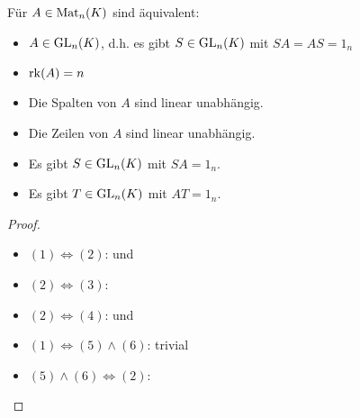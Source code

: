 \begin{conclusion}
	Für $A\in \operatorname{Mat}_n(K)$ sind äquivalent:
	\begin{itemize}
		\item $A\in \operatorname{GL}_n(K)$, d.h. es gibt $S\in \operatorname{GL}_n(K)$ mit $SA=AS=1_n$
		\item $\operatorname{rk}(A)=n$
		\item Die Spalten von $A$ sind linear unabhängig.
		\item Die Zeilen von $A$ sind linear unabhängig.
		\item Es gibt $S\in \operatorname{GL}_n(K)$ mit $SA=1_n$.
		\item Es gibt $T\in \operatorname{GL}_n(K)$ mit $AT=1_n$.
	\end{itemize}
\end{conclusion}
\begin{proof}
	\begin{itemize}
		\item $(1)\iff (2)$:  und 
		\item $(2)\iff (3)$: 
		\item $(2)\iff (4)$:  und 
		\item $(1)\iff (5)\land (6)$: trivial
		\item $(5)\land (6)\iff (2)$: 
	\end{itemize}
\end{proof}